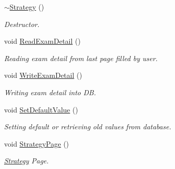 \begin{DoxyCompactItemize}
\item 
\hyperlink{classStrategy_a37c0bbdd64fd7dfcdd91578784a64775}{$\sim$\-Strategy} ()
\begin{DoxyCompactList}\small\item\em Destructor. \end{DoxyCompactList}\item 
\hypertarget{classStrategy_abb7a716f8403d4ec3d5d127f789ba6ba}{void \hyperlink{classStrategy_abb7a716f8403d4ec3d5d127f789ba6ba}{Read\-Exam\-Detail} ()}\label{classStrategy_abb7a716f8403d4ec3d5d127f789ba6ba}

\begin{DoxyCompactList}\small\item\em Reading exam detail from last page filled by user. \end{DoxyCompactList}\item 
\hypertarget{classStrategy_a3825da44242fdf8442ffbd9cfd922803}{void \hyperlink{classStrategy_a3825da44242fdf8442ffbd9cfd922803}{Write\-Exam\-Detail} ()}\label{classStrategy_a3825da44242fdf8442ffbd9cfd922803}

\begin{DoxyCompactList}\small\item\em Writing exam detail into D\-B. \end{DoxyCompactList}\item 
\hypertarget{classStrategy_a5ae1ee77d05ad12afedef648f583328a}{void \hyperlink{classStrategy_a5ae1ee77d05ad12afedef648f583328a}{Set\-Default\-Value} ()}\label{classStrategy_a5ae1ee77d05ad12afedef648f583328a}

\begin{DoxyCompactList}\small\item\em Setting default or retrieving old values from database. \end{DoxyCompactList}\item 
\hypertarget{classStrategy_ac3f851b75390a71e3a4c6dfd9b15dafb}{void \hyperlink{classStrategy_ac3f851b75390a71e3a4c6dfd9b15dafb}{Strategy\-Page} ()}\label{classStrategy_ac3f851b75390a71e3a4c6dfd9b15dafb}

\begin{DoxyCompactList}\small\item\em \hyperlink{classStrategy}{Strategy} Page. \end{DoxyCompactList}\end{DoxyCompactItemize}
